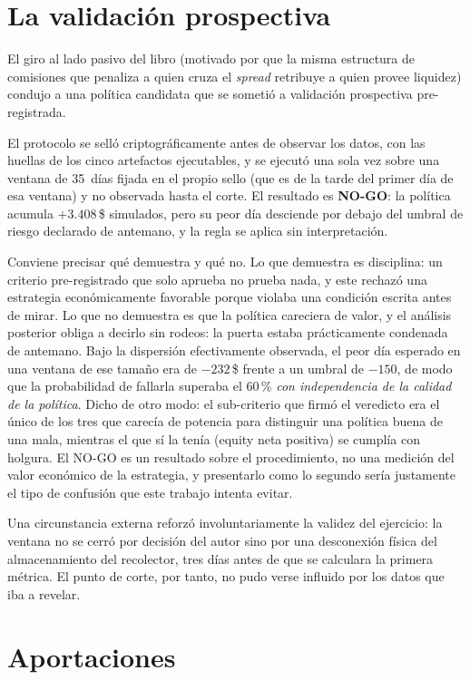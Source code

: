 \section{La validación prospectiva}

El giro al lado pasivo del libro (motivado por que la misma estructura de comisiones que
penaliza a quien cruza el \emph{spread} retribuye a quien provee liquidez) condujo a una
política candidata que se sometió a validación prospectiva pre-registrada.

El protocolo se selló criptográficamente antes de observar los datos, con las huellas de los
cinco artefactos ejecutables, y se ejecutó una sola vez sobre una ventana de 35~días fijada
en el propio sello (que es de la tarde del primer día de esa ventana) y no observada hasta
el corte. El resultado es \textbf{NO-GO}: la política acumula $+3.408$\,\$
simulados, pero su peor día desciende por debajo del umbral de riesgo declarado de antemano,
y la regla se aplica sin interpretación.

Conviene precisar qué demuestra y qué no. Lo que demuestra es disciplina: un criterio
pre-registrado que solo aprueba no prueba nada, y este rechazó una estrategia
económicamente favorable porque violaba una condición escrita antes de mirar. Lo que no
demuestra es que la política careciera de valor, y el análisis posterior obliga a decirlo
sin rodeos: la puerta estaba prácticamente condenada de antemano. Bajo la dispersión
efectivamente observada, el peor día esperado en una ventana de ese tamaño era de
$-232$\,\$ frente a un umbral de $-150$, de modo que la probabilidad de fallarla superaba
el 60\,\% \emph{con independencia de la calidad de la política}. Dicho de otro modo: el
sub-criterio que firmó el veredicto era el único de los tres que carecía de potencia para
distinguir una política buena de una mala, mientras el que sí la tenía (equity neta
positiva) se cumplía con holgura. El NO-GO es un resultado sobre el procedimiento, no una
medición del valor económico de la estrategia, y presentarlo como lo segundo sería
justamente el tipo de confusión que este trabajo intenta evitar.

Una circunstancia externa reforzó involuntariamente la validez del ejercicio: la ventana no
se cerró por decisión del autor sino por una desconexión física del almacenamiento del
recolector, tres días antes de que se calculara la primera métrica. El punto de corte, por
tanto, no pudo verse influido por los datos que iba a revelar.

\section{Aportaciones}

